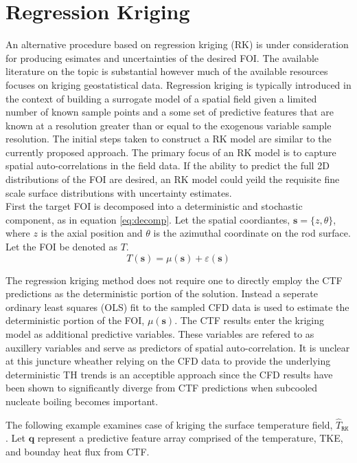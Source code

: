 \section{Regression Kriging}

An alternative procedure based on regression kriging (RK) is under consideration for producing esimates and uncertainties of the desired FOI.
The available literature on the topic is substantial however much of the available resources focuses on kriging geostatistical data.  Regression kriging is typically introduced in the context of building
a surrogate model of a spatial field given a limited number of known sample points and a some set of predictive features that are known at a resolution greater than or equal to the exogenous variable sample resolution.
The initial steps taken to construct a RK model are similar to the currently proposed approach.  The primary focus of an RK model is to capture spatial auto-correlations in the field data.   If the ability to predict the full 2D distributions of the FOI are desired, an RK model could yeild the requisite fine scale surface distributions with uncertainty estimates. \\

First the target FOI is decomposed into a deterministic and stochastic component, as in equation \ref{eq:decomp}.
Let the spatial coordiantes, $\mathbf{s} = \{z, \theta\}$,
where $z$ is the axial position and $\theta$ is the azimuthal coordinate on the rod surface. Let the FOI be denoted as $T$.
\begin{equation}
T(\mathbf s) = \mu(\mathbf s) + \varepsilon(\mathbf s)
\label{eq:decomp}
\end{equation}

The regression kriging method does not require one to directly employ the
CTF predictions as the deterministic portion of the solution.   
Instead
a seperate ordinary least squares (OLS) fit to the sampled CFD data is used to estimate the deterministic portion of the FOI, $ \mu(\mathbf s)$.
The CTF results enter the kriging model as additional predictive variables.  These variables are refered to as auxillery variables and serve as predictors of spatial auto-correlation.
It is unclear at this juncture wheather relying on the CFD data to provide the underlying deterministic TH trends  is an acceptible approach since the CFD results have been shown to significantly diverge from
CTF predictions when subcooled nucleate boiling becomes important.

The following example examines case of kriging the surface temperature field, $\hat T_\mathtt{RK}$.
Let $\mathbf{q}$ represent a predictive feature array comprised of the temperature,
TKE, and bounday heat flux from CTF.

